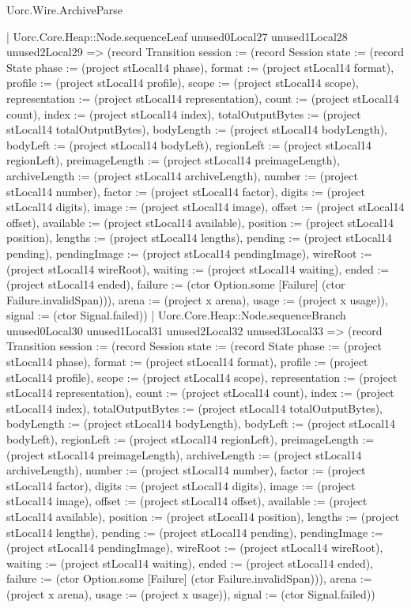 \begin{lexlean}{Uorc.Wire.ArchiveParse}
\begin{semanticmodule}
{            | Uorc.Core.Heap::Node.sequenceLeaf unused0Local27 unused1Local28 unused2Local29 => (record Transition {session := (record Session {state := (record State {phase := (project stLocal14 phase), format := (project stLocal14 format), profile := (project stLocal14 profile), scope := (project stLocal14 scope), representation := (project stLocal14 representation), count := (project stLocal14 count), index := (project stLocal14 index), totalOutputBytes := (project stLocal14 totalOutputBytes), bodyLength := (project stLocal14 bodyLength), bodyLeft := (project stLocal14 bodyLeft), regionLeft := (project stLocal14 regionLeft), preimageLength := (project stLocal14 preimageLength), archiveLength := (project stLocal14 archiveLength), number := (project stLocal14 number), factor := (project stLocal14 factor), digits := (project stLocal14 digits), image := (project stLocal14 image), offset := (project stLocal14 offset), available := (project stLocal14 available), position := (project stLocal14 position), lengths := (project stLocal14 lengths), pending := (project stLocal14 pending), pendingImage := (project stLocal14 pendingImage), wireRoot := (project stLocal14 wireRoot), waiting := (project stLocal14 waiting), ended := (project stLocal14 ended), failure := (ctor Option.some [Failure] (ctor Failure.invalidSpan))}), arena := (project x arena), usage := (project x usage)}), signal := (ctor Signal.failed)})
            | Uorc.Core.Heap::Node.sequenceBranch unused0Local30 unused1Local31 unused2Local32 unused3Local33 => (record Transition {session := (record Session {state := (record State {phase := (project stLocal14 phase), format := (project stLocal14 format), profile := (project stLocal14 profile), scope := (project stLocal14 scope), representation := (project stLocal14 representation), count := (project stLocal14 count), index := (project stLocal14 index), totalOutputBytes := (project stLocal14 totalOutputBytes), bodyLength := (project stLocal14 bodyLength), bodyLeft := (project stLocal14 bodyLeft), regionLeft := (project stLocal14 regionLeft), preimageLength := (project stLocal14 preimageLength), archiveLength := (project stLocal14 archiveLength), number := (project stLocal14 number), factor := (project stLocal14 factor), digits := (project stLocal14 digits), image := (project stLocal14 image), offset := (project stLocal14 offset), available := (project stLocal14 available), position := (project stLocal14 position), lengths := (project stLocal14 lengths), pending := (project stLocal14 pending), pendingImage := (project stLocal14 pendingImage), wireRoot := (project stLocal14 wireRoot), waiting := (project stLocal14 waiting), ended := (project stLocal14 ended), failure := (ctor Option.some [Failure] (ctor Failure.invalidSpan))}), arena := (project x arena), usage := (project x usage)}), signal := (ctor Signal.failed)})
}
\end{semanticmodule}
\end{lexlean}
